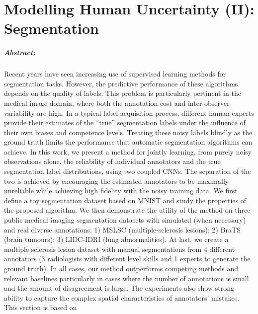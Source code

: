 \chapter{Modelling Human Uncertainty (II): Segmentation} \label{chapter:humanuncertainty_segmentation}

\paragraph{Abstract: }
Recent years have seen increasing use of supervised learning methods for segmentation tasks. However, the predictive performance of these algorithms depends on the quality of labels. This problem is particularly pertinent in the medical image domain, where both the annotation cost and inter-observer variability are high. In a typical label acquisition process, different human experts provide their estimates of the ``true'' segmentation labels under the influence of their own biases and competence levels. Treating these noisy labels blindly as the ground truth limits the performance that automatic segmentation algorithms can achieve. In this work, we present a method for jointly learning, from purely noisy observations alone, the reliability of individual annotators and the true segmentation label distributions, using two coupled CNNs. The separation of the two is achieved by encouraging the estimated annotators to be maximally unreliable while achieving high fidelity with the noisy training data. We first define a toy segmentation dataset based on MNIST and study the properties of the proposed algorithm. We then demonstrate the utility of the method on three public medical imaging segmentation datasets with simulated (when necessary) and real diverse annotations: 1) MSLSC (multiple-sclerosis lesions); 2) BraTS (brain tumours); 3) LIDC-IDRI (lung abnormalities). At last, we create a multiple sclerosis lesion dataset with manual segmentations from 4 different annotators (3 radiologists with different level skills and 1 experts to generate the ground truth). In all cases, our method outperforms competing methods and relevant baselines particularly in cases where the number of annotations is small and the amount of disagreement is large. The experiments also show strong ability to capture the complex spatial characteristics of annotators' mistakes. This section is based on 



